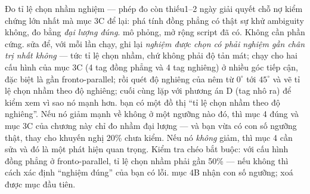 \documentclass[../../marker.tex]{subfiles}
\begin{document}
\begin{duan}{Đo tỉ lệ chọn nhầm nghiệm --- phép đo còn thiếu}{1--2 ngày}
\dmt giải quyết chỗ nợ kiểm chứng lớn nhất mà mục 3C để lại: phá tính đồng phẳng có thật sự khử ambiguity không, đo bằng \emph{đại lượng đúng}.
\ddl mô phỏng, mở rộng script đã có. Không cần phần cứng.
\dbc sửa  để, với mỗi lần chạy, ghi lại \emph{nghiệm được chọn có phải nghiệm gần chân trị nhất không} --- tức tỉ lệ chọn nhầm, chứ không phải độ tản mát; chạy cho hai cấu hình của mục 3C (4 tag đồng phẳng và 4 tag nghiêng) ở nhiều góc tiếp cận, đặc biệt là gần fronto-parallel; rồi quét độ nghiêng của nêm từ \(0^\circ\) tới \(45^\circ\) và vẽ tỉ lệ chọn nhầm theo độ nghiêng; cuối cùng lặp với phương án D (tag nhô ra) để kiểm xem vì sao nó mạnh hơn.
\dxk bạn có một đồ thị ``tỉ lệ chọn nhầm theo độ nghiêng''. Nếu nó giảm mạnh về không ở một ngưỡng nào đó, thì  mục 4 đúng và mục 3C của chương này chỉ đo nhầm đại lượng --- và bạn vừa có con số ngưỡng thật, thay cho khuyến nghị 20\% chưa kiểm. Nếu nó \emph{không} giảm, thì  mục 4 cần sửa và đó là một phát hiện quan trọng. Kiểm tra chéo bắt buộc: với cấu hình đồng phẳng ở fronto-parallel, tỉ lệ chọn nhầm phải gần 50\% --- nếu không thì cách xác định ``nghiệm đúng'' của bạn có lỗi.
\dnv {} mục 4B nhận con số ngưỡng;  xoá được mục đầu tiên.
\end{duan}
\end{document}
